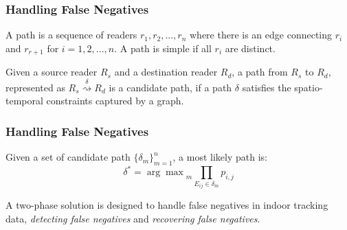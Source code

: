
\begin{frame}
\frametitle{Handling False Negatives}

\begin{definition}[Path]
  A path is a sequence of readers $r_1, r_2, ..., r_n$ where there is an edge connecting $r_i$ and $r_{r+1}$ for $i = 1, 2,...,n$. A path is simple if all $r_i$ are distinct.
\end{definition}

\begin{definition}
  Given a source reader $R_s$ and a destination reader $R_d$, a path from $R_s$ to $R_d$, represented as $R_s \overset{\delta}{\rightsquigarrow} R_d$ is a candidate path, if a path $\delta$ satisfies the spatio-temporal constraints captured by a graph.
\end{definition}

\end{frame}


\begin{frame}
\frametitle{Handling False Negatives}

\begin{definition}
  Given a set of candidate path $\{ \delta_m \}_{m=1}^n$, a most likely path is:
  \begin{equation}
    \delta^* = {\arg\max}_m \prod_{E_{ij} \in \delta_m} p_{i,j}
  \end{equation}
\end{definition}

A two-phase solution is designed to handle false negatives in indoor tracking data, \emph{detecting false negatives} and \emph{recovering false negatives}.

\end{frame}


